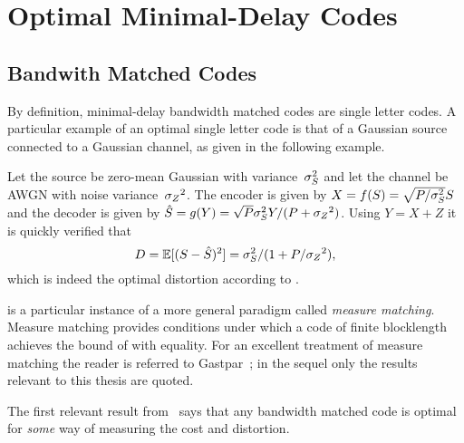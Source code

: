\section{Optimal Minimal-Delay Codes}
\label{sec:optmindel}

\subsection{Bandwith Matched Codes}

By definition, minimal-delay bandwidth matched codes are single letter codes. A
particular example of an optimal single letter code is that of a Gaussian source
connected to a Gaussian channel, as given in the following example.
\begin{example}
  \label{ex:gausssingle}
  Let the source be zero-mean Gaussian with variance~${\sigma_S^2}$ and let the channel
  be AWGN with noise variance~${{\sigma_Z}^2}$. The encoder is given by $X = f(S) =
  \sqrt{P/{\sigma_S^2}} S$ and the decoder is given by ${\hat{S}} = g(Y) = \sqrt{P} {\sigma_S^2} Y /
  (P + {{\sigma_Z}^2})$. Using $Y = X + Z$ it is quickly verified that 
  \begin{equation*}
    D = \mathbb{E}[(S - {\hat{S}})^2] = {\sigma_S^2} / (1 + P/{{\sigma_Z}^2}),
  \end{equation*}
  which is indeed the optimal distortion according to
  .
\end{example}

 is a particular instance of a more general paradigm called
\emph{measure matching}. Measure matching provides conditions under which a code
of finite blocklength achieves the bound of  with equality.
For an excellent treatment of measure matching the reader is referred to
Gastpar~\cite{GastparRV2003,GastparThesis}; in the sequel only the results
relevant to this thesis are quoted.

The first relevant result from~\cite{GastparRV2003} says that any bandwidth
matched code is optimal for \emph{some} way of measuring the cost and
distortion.

